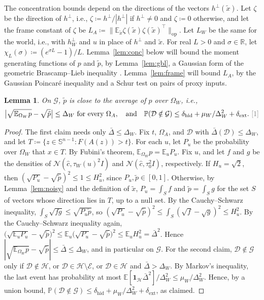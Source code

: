 \documentclass[10pt]{article}
\newcommand{\leanmark}[1]{{\relscale{0.78}\color{gray}[#1]}}
\newtheorem{lemma}{Lemma}
\newcommand{\RR}{\mathbb{R}}
\newcommand{\Dd}{\mathcal{D}}\newcommand{\Ee}{\mathcal{E}}
\newcommand{\Gg}{\mathcal{G}}\newcommand{\Hh}{\mathcal{H}}
\newcommand{\SSS}{\mathbb{S}}\newcommand{\Kk}{\mathcal{K}}\newcommand{\Nn}{\mathcal{N}}\newcommand{\Bb}{\mathcal{B}}
\newcommand{\EE}{\mathbb{E}}
\newcommand{\PP}{\mathbb{P}}
\newcommand{\chat}{\hat c}
\begin{document}
The concentration bounds depend on the directions of the vectors
$h^\perp(\tilde x)$. Let $\zeta$ be the direction of $h^\perp$, i.e.,
$\zeta\coloneqq h^\perp/|h^\perp|$ if $h^\perp\ne0$ and $\zeta\coloneqq0$ otherwise, and let the frame constant of $\zeta$ be
$L_A\coloneqq \|\EE_{\tilde x}\zeta(\tilde x)\zeta(\tilde x)^\top\|_{\mathrm{op}}$.
Let $L_W$ be the same for the world, i.e., with $h_W^\perp$ and $u$ in place
of $h^\perp$ and $\tilde x$. For real $L>0$ and $\sigma\in\RR$, let
$\chi_L(\sigma)\coloneqq (e^{\sigma L}-1)/L$. Lemma~\ref{lem:conc} below will bound the moment
generating functions of $p$ and $\tilde p$, by Lemma~\ref{lem:gbl}, a Gaussian
form of the geometric Brascamp--Lieb inequality
\citep[Proposition~2.8]{bcct-2008}. Lemma~\ref{lem:frame}
will bound $L_A$, by the Gaussian Poincar\'e inequality and a Schur test on
pairs of proxy inputs.
\begin{lemma}\label{lem:dw}
  On $\Gg$, $\tilde p$ is close to the average of $p$ over $\Omega_W$, i.e.,
  \[\bigl|\sqrt{\EE_{\Omega_W}p}-\sqrt{\tilde p}\bigr|\le\Delta_W\ \text{for every }\Omega_A,
  \quad\text{and}\quad\PP(\Dd\notin\Gg)\le\delta_{\mathrm{hid}}+\mu_W/\Delta_W^2+\delta_{\mathrm{ext}}.~\leanmark{1}\]
\end{lemma}
\begin{proof}
The first claim needs only $\bar\Delta\le\Delta_W$. Fix $t$, $\Omega_A$, and $\Dd$ with
$\bar\Delta(\Dd)\le\Delta_W$, and let
$T\coloneqq\{z\in\SSS^{n-1}:F(A(z))>t\}$. For each $u$, let $P_u$ be the
probability over $\Omega_W$ that $x\in T$. By Fubini's theorem,
$\EE_{\Omega_W}p=\EE_uP_u$. Fix $u$, and let $f$ and $g$ be the densities of
$\Nn(\chat,\tau_W(u)^2I)$ and $\Nn(\chat,\tau_0^2I)$, respectively. If $H_u=\sqrt2$, then
$(\sqrt{P_u}-\sqrt{\tilde p})^2\le1\le H_u^2$, since
$P_u,\tilde p\in[0,1]$. Otherwise, by Lemma~\ref{lem:noisy} and the
definition of $\tilde x$, $P_u=\int_Sf$ and $\tilde p=\int_Sg$ for the set
$S$ of vectors whose direction lies in $T$, up to a null set. By the
Cauchy--Schwarz inequality, $\int_S\sqrt{fg}\le\sqrt{P_u\tilde p}$, so
$(\sqrt{P_u}-\sqrt{\tilde p})^2\le\int_S(\sqrt f-\sqrt g)^2\le H_u^2$. By the
Cauchy--Schwarz inequality again,
$\bigl(\sqrt{\EE_uP_u}-\sqrt{\tilde p}\bigr)^2\le\EE_u\bigl(\sqrt{P_u}-\sqrt{\tilde p}\bigr)^2
\le\EE_uH_u^2=\bar\Delta^2$. Hence
$|\sqrt{\EE_{\Omega_W}p}-\sqrt{\tilde p}|\le\bar\Delta\le\Delta_W$, and in
particular on $\Gg$. For the second claim, $\Dd\notin\Gg$ only if
$\Dd\notin\Hh$, or $\Dd\in\Hh\setminus\Ee$, or $\Dd\in\Hh$ and
$\bar\Delta>\Delta_W$. By Markov's inequality, the last event has probability
at most $\EE[\mathbf 1_\Hh\bar\Delta^2]/\Delta_W^2\le\mu_W/\Delta_W^2$. Hence,
by a union bound,
$\PP(\Dd\notin\Gg)\le\delta_{\mathrm{hid}}+\mu_W/\Delta_W^2+\delta_{\mathrm{ext}}$,
as claimed.
\end{proof}
\end{document}
